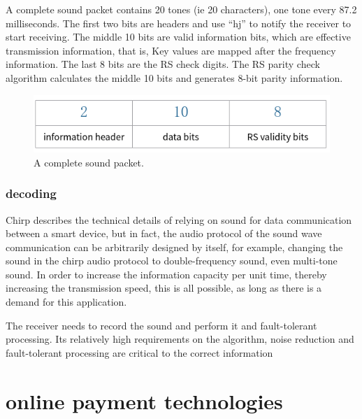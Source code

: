 \documentclass[journal]{IEEEtran}
\begin{document}
A complete sound packet contains 20 tones (ie 20 characters), one tone every 87.2 milliseconds. The first two bits are headers and use “hj” to notify the receiver to start receiving. The middle 10 bits are valid information bits, which are effective transmission information, that is, Key values are mapped after the frequency information. The last 8 bits are the RS check digits. The RS parity check algorithm calculates the middle 10 bits and generates 8-bit parity information.

\begin{figure}[htbp]
\centerline{\includegraphics[scale=0.4]{yinpinwei.png}}
\caption{A complete sound packet.}
\label{fig}
\end{figure}

\subsubsection{decoding}

Chirp describes the technical details of relying on sound for data communication between a smart device, but in fact, the audio protocol of the sound wave communication can be arbitrarily designed by itself, for example, changing the sound in the chirp audio protocol to double-frequency sound, even multi-tone sound. In order to increase the information capacity per unit time, thereby increasing the transmission speed, this is all possible, as long as there is a demand for this application.

The receiver needs to record the sound and perform it and fault-tolerant processing. Its relatively high requirements on the algorithm, noise reduction and fault-tolerant processing are critical to the correct information

\section{online payment technologies}
\end{document}
